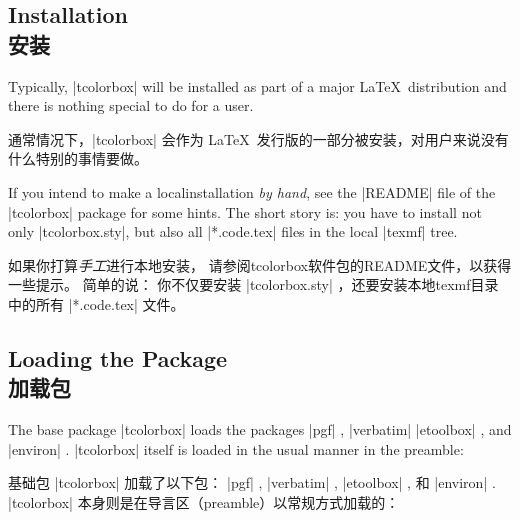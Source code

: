 \subsection{Installation\\安装}

Typically, |tcolorbox| will be installed as part of a major \LaTeX\ distribution
and there is nothing special to do for a user.

通常情况下，|tcolorbox| 会作为%
\LaTeX\ 发行版的一部分被安装，对用户来说没有什么特别的事情要做。

If you intend to make a localinstallation \emph{by hand}, %
see the |README| file of the |tcolorbox| package for some hints. %
The short story is: you have to install not only |tcolorbox.sty|, %
but also all |*.code.tex| files in the local |texmf| tree.

如果你打算\emph{手工}进行本地安装，%
请参阅tcolorbox软件包的README文件，以获得一些提示。%
简单的说： 你不仅要安装 |tcolorbox.sty| ，还要安装本地texmf目录中的所有 |*.code.tex| 文件。

\subsection{Loading the Package\\加载包}


The base package |tcolorbox| loads the packages
|pgf| %
, |verbatim| %
|etoolbox| %
, and |environ| %
.
|tcolorbox| itself is loaded in the usual manner in the preamble:

基础包 |tcolorbox| 加载了以下包：
|pgf| ,%
|verbatim| ,%
|etoolbox| ,%
和 |environ| .%
% 
|tcolorbox| 本身则是在导言区（preamble）以常规方式加载的：


\begin{dispListing}
\usepackage{tcolorbox}
\end{dispListing}


